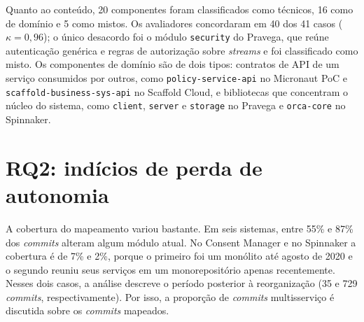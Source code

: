 \begin{table}[htbp]
\centering
{}
\end{table}

Quanto ao conteúdo, 20 componentes foram classificados como técnicos, 16 como de domínio e 5 como mistos. Os avaliadores concordaram em 40 dos 41 casos ($\kappa = 0{,}96$); o único desacordo foi o módulo \texttt{security} do Pravega, que reúne autenticação genérica e regras de autorização sobre \textit{streams} e foi classificado como misto. Os componentes de domínio são de dois tipos: contratos de API de um serviço consumidos por outros, como \texttt{policy-service-api} no Micronaut PoC e \texttt{scaffold-business-sys-api} no Scaffold Cloud, e bibliotecas que concentram o núcleo do sistema, como \texttt{client}, \texttt{server} e \texttt{storage} no Pravega e \texttt{orca-core} no Spinnaker.

\section{RQ2: indícios de perda de autonomia}
\label{sec:res-rq2}

A cobertura do mapeamento variou bastante. Em seis sistemas, entre 55\% e 87\% dos \textit{commits} alteram algum módulo atual. No Consent Manager e no Spinnaker a cobertura é de 7\% e 2\%, porque o primeiro foi um monólito até agosto de 2020 e o segundo reuniu seus serviços em um monorepositório apenas recentemente. Nesses dois casos, a análise descreve o período posterior à reorganização (35 e 729 \textit{commits}, respectivamente). Por isso, a proporção de \textit{commits} multisserviço é discutida sobre os \textit{commits} mapeados.

